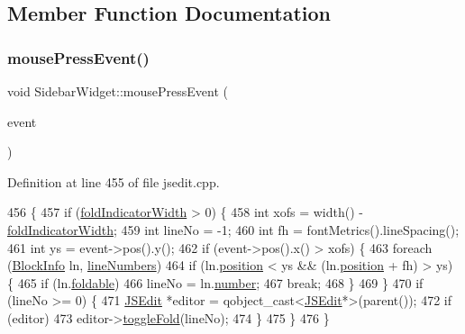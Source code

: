 \subsection{Member Function Documentation}
\mbox{\label{class_sidebar_widget_a5908595bfafd6a963901894cec3224bb}} 
\subsubsection{\texorpdfstring{mouse\+Press\+Event()}{mousePressEvent()}}
{\footnotesize\ttfamily void Sidebar\+Widget\+::mouse\+Press\+Event (\begin{DoxyParamCaption}\item[{Q\+Mouse\+Event $\ast$}]{event }\end{DoxyParamCaption})\hspace{0.3cm}{\ttfamily [protected]}}



Definition at line 455 of file jsedit.\+cpp.


\begin{DoxyCode}
456 \{
457     \textcolor{keywordflow}{if} (\hyperlink{class_sidebar_widget_a8be447556cc4ec612153b05eec332513}{foldIndicatorWidth} > 0) \{
458         \textcolor{keywordtype}{int} xofs = width() - \hyperlink{class_sidebar_widget_a8be447556cc4ec612153b05eec332513}{foldIndicatorWidth};
459         \textcolor{keywordtype}{int} lineNo = -1;
460         \textcolor{keywordtype}{int} fh = fontMetrics().lineSpacing();
461         \textcolor{keywordtype}{int} ys = \textcolor{keyword}{event}->pos().y();
462         \textcolor{keywordflow}{if} (event->pos().x() > xofs) \{
463             \textcolor{keywordflow}{foreach} (\hyperlink{struct_block_info}{BlockInfo} ln, \hyperlink{class_sidebar_widget_ac6820d4338c9763dd3b6a2da710a0fb0}{lineNumbers})
464                 \textcolor{keywordflow}{if} (ln.\hyperlink{struct_block_info_a6333e999c5d9f3e8882776e66eb087c0}{position} < ys && (ln.\hyperlink{struct_block_info_a6333e999c5d9f3e8882776e66eb087c0}{position} + fh) > ys) \{
465                     \textcolor{keywordflow}{if} (ln.\hyperlink{struct_block_info_a777eccf7133be7d93623791ffd0a3282}{foldable})
466                         lineNo = ln.\hyperlink{struct_block_info_a7f39cc445f8a30a859859f49e59640ee}{number};
467                     \textcolor{keywordflow}{break};
468                 \}
469         \}
470         \textcolor{keywordflow}{if} (lineNo >= 0) \{
471             \hyperlink{class_j_s_edit}{JSEdit} *editor = qobject\_cast<\hyperlink{class_j_s_edit}{JSEdit}*>(parent());
472             \textcolor{keywordflow}{if} (editor)
473                 editor->\hyperlink{class_j_s_edit_ae2955b517e15a98c85252efef452ae8a}{toggleFold}(lineNo);
474         \}
475     \}
476 \}
\end{DoxyCode}
\mbox{\label{class_sidebar_widget_ae74f39b64dca90cf88e35ccbbe9eb5b6}} 
